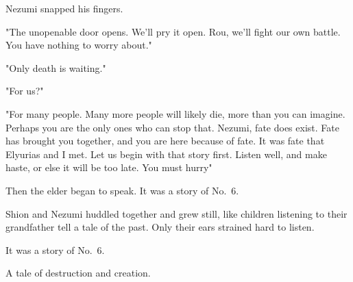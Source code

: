 Nezumi snapped his fingers.

"The unopenable door opens. We'll pry it open. Rou, we'll fight our own
battle. You have nothing to worry about."

"Only death is waiting."

"For us?"

"For many people. Many more people will likely die, more than you can
imagine. Perhaps you are the only ones who can stop that. Nezumi, fate
does exist. Fate has brought you together, and you are here because of
fate. It was fate that Elyurias and I met. Let us begin with that story
first. Listen well, and make haste, or else it will be too late. You
must hurry\el "

Then the elder began to speak. It was a story of No.~6.

Shion and Nezumi huddled together and grew still, like children
listening to their grandfather tell a tale of the past. Only their ears
strained hard to listen.

It was a story of No.~6.

A tale of destruction and creation.